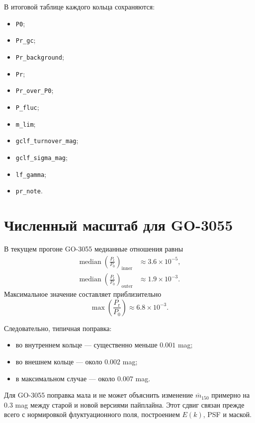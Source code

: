 \documentclass[12pt,a4paper]{article}
\newcommand{\Prpow}{P_{\mathrm r}}
\begin{document}
В итоговой таблице каждого кольца сохраняются:
\begin{itemize}
    \item \texttt{P0};
    \item \texttt{Pr\_gc};
    \item \texttt{Pr\_background};
    \item \texttt{Pr};
    \item \texttt{Pr\_over\_P0};
    \item \texttt{P\_fluc};
    \item \texttt{m\_lim};
    \item \texttt{gclf\_turnover\_mag};
    \item \texttt{gclf\_sigma\_mag};
    \item \texttt{lf\_gamma};
    \item \texttt{pr\_note}.
\end{itemize}

\section{Численный масштаб для GO-3055}

В текущем прогоне GO-3055 медианные отношения равны
\begin{align}
    \operatorname{median}
    \left(\frac{\Prpow}{P_0}\right)_{\mathrm{inner}}
    &\approx3.6\times10^{-5},\\
    \operatorname{median}
    \left(\frac{\Prpow}{P_0}\right)_{\mathrm{outer}}
    &\approx1.9\times10^{-3}.
\end{align}
Максимальное значение составляет приблизительно
\begin{equation}
    \max\left(\frac{\Prpow}{P_0}\right)
    \approx6.8\times10^{-3}.
\end{equation}

Следовательно, типичная поправка:
\begin{itemize}
    \item во внутреннем кольце --- существенно меньше
    \(0.001\) mag;
    \item во внешнем кольце --- около \(0.002\) mag;
    \item в максимальном случае --- около \(0.007\) mag.
\end{itemize}

Для GO-3055 поправка мала и не может объяснить изменение
\(\overline m_{150}\) примерно на \(0.3\) mag между старой и
новой версиями пайплайна. Этот сдвиг связан прежде всего с
нормировкой флуктуационного поля, построением \(E(k)\), PSF и
маской.
\end{document}
